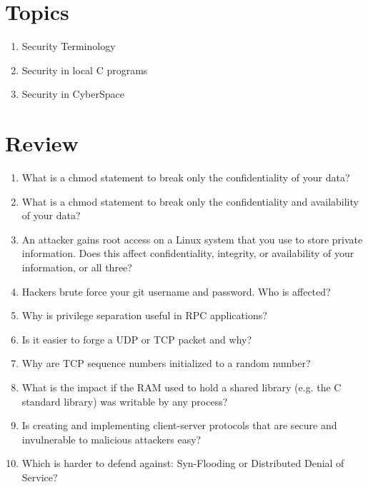 \section{Topics}

\begin{enumerate}
\item Security Terminology
\item Security in local C programs
\item Security in CyberSpace
\end{enumerate}

\section{Review}

\begin{enumerate}
\item What is a chmod statement to break only the confidentiality of your data?

\item What is a chmod statement to break only the confidentiality and availability of your data?

\item An attacker gains root access on a Linux system that you use to store private information. Does this affect confidentiality, integrity, or availability of your information, or all three?

\item Hackers brute force your git username and password. Who is affected?

\item Why is privilege separation useful in RPC applications?

\item Is it easier to forge a UDP or TCP packet and why? 

\item Why are TCP sequence numbers initialized to a random number?

\item What is the impact if the RAM used to hold a shared library (e.g. the C standard library) was writable by any process?

\item Is creating and implementing client-server protocols that are secure and invulnerable to malicious attackers easy?

\item Which is harder to defend against: Syn-Flooding or Distributed Denial of Service?


\end{enumerate}
